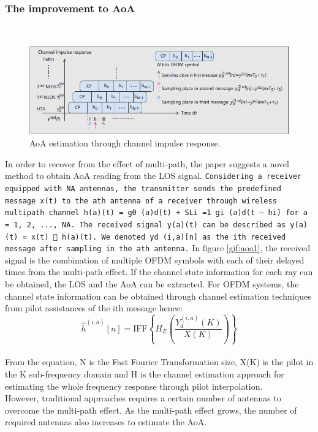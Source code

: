 \documentclass{l4proj}
\begin{document}
\subsubsection{The improvement to AoA}~\\
\FloatBarrier
\begin{figure}[h]
    \centering
    \includegraphics[width=\textwidth]{images/aoa}
    \caption{AoA estimation through channel impulse response.}
    \label{fig:aoa1}
\end{figure}
In order to recover from the effect of multi-path, the paper suggests a novel method to obtain AoA reading from the LOS signal. \texttt{Considering a receiver equipped with NA antennas, the transmitter sends the predefined message x(t) to the ath antenna of a receiver through wireless multipath channel h(a)(t) = g0 (a)d(t) + SLi =1 gi (a)d(t – hi) for a = 1, 2, ..., NA. The received signal y(a)(t) can be described as y(a)(t) = x(t)  h(a)(t). We denoted yd (i,a)[n] as the ith received message after sampling in the ath antenna.} In figure \ref{gif:aoa1}, the received signal is the combination of multiple OFDM symbols with each of their delayed times from the multi-path effect. If the channel state information for each ray can be obtained, the LOS and the AoA can be extracted. For OFDM systems, the channel state information can be obtained through channel estimation techniques from pilot assistances of the ith message hence:\\
\begin{equation*} \hat{h}^{(i, a)}[n]=\text{IFF}\left\{H_{E}(\frac{Y_{d}^{(i, a)}(K)}{X(K)})\right\}\tag{2} \end{equation*}\\
From the equation, N is the Fast Fourier Transformation size, X(K) is the pilot in the K sub-frequency domain and H is the channel estimation approach for estimating the whole frequency response through pilot interpolation.\\
However, traditional approaches requires a certain number of antennas to overcome the multi-path effect. As the multi-path effect grows, the number of required antennas also increases to estimate the AoA.\cite{improveaoa}\\
\end{document}
